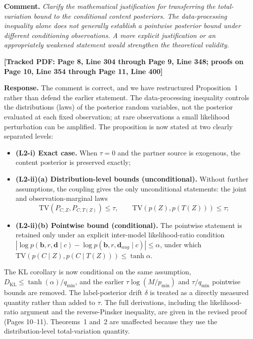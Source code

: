 \documentclass[11pt]{article}
\newcommand{\loc}[1]{\textbf{[\textcolor{revblue}{Tracked PDF: #1}]}}
\begin{document}
\textbf{Comment.} \textit{Clarify the mathematical justification for
transferring the total-variation bound to the conditional content posteriors.
The data-processing inequality alone does not generally establish a pointwise
posterior bound under different conditioning observations. A more explicit
justification or an appropriately weakened statement would strengthen the
theoretical validity.}

\loc{Page 8, Line 304 through Page 9, Line 348; proofs on Page 10, Line 354
through Page 11, Line 400}

\textbf{Response.} The comment is correct, and we have restructured
Proposition~1 rather than defend the earlier statement. The data-processing
inequality controls the distributions (laws) of the posterior random
variables, not the posterior evaluated at each fixed observation; at rare
observations a small likelihood perturbation can be amplified. The proposition
is now stated at two clearly separated levels:

\begin{itemize}
\item \textbf{(L2-i) Exact case.} When $\tau=0$ and the partner source is
exogenous, the content posterior is preserved exactly;
\item \textbf{(L2-ii)(a) Distribution-level bounds (unconditional).} Without
further assumptions, the coupling gives the only unconditional statements: the
joint and observation-marginal laws
\[
\mathrm{TV}(P_{C,Z},P_{C,T(Z)})\le\tau,\qquad
\mathrm{TV}(p(Z),p(T(Z)))\le\tau;
\]
\item \textbf{(L2-ii)(b) Pointwise bound (conditional).} The pointwise
statement is retained only under an explicit inter-model likelihood-ratio
condition $|\log p(\mathbf{b},r,\mathbf{d}\mid c)-\log
p(\mathbf{b},r,\mathbf{d}_{aug}\mid c)|\le\alpha$, under which
$\mathrm{TV}(p(C\mid Z),p(C\mid T(Z)))\le\tanh\alpha$.
\end{itemize}

The KL corollary is now conditional on the same assumption,
$D_{\mathrm{KL}}\le\tanh(\alpha)/q_{\min}$, and the earlier
$\tau\log(M/p_{\min})$ and $\tau/q_{\min}$ pointwise bounds are removed. The
label-posterior drift $\delta$ is treated as a directly measured quantity
rather than added to $\tau$. The full derivations, including the
likelihood-ratio argument and the reverse-Pinsker inequality, are given in the
revised proof (Pages 10--11). Theorems~1 and~2 are unaffected because they use
the distribution-level total-variation quantity.
\end{document}
